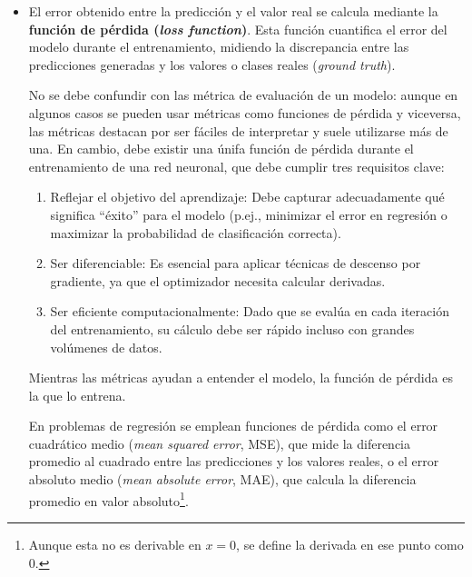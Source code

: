 \begin{itemize}

    \item El error obtenido entre la predicción y el valor real se calcula mediante la \textbf{función de 
    pérdida (\textit{loss function})}. Esta función cuantifica el error del modelo durante el entrenamiento, 
    midiendo la discrepancia entre las predicciones generadas y los valores o clases reales (\textit{ground 
    truth}).

    No se debe confundir con las métrica de evaluación de un modelo: aunque en algunos casos se pueden usar 
    métricas como funciones de pérdida y viceversa, las métricas destacan por ser fáciles de interpretar 
    y suele utilizarse más de una. En cambio, debe existir una únifa función de pérdida durante el 
    entrenamiento de una red neuronal, que debe cumplir tres requisitos clave:

    \begin{enumerate}

        \item Reflejar el objetivo del aprendizaje: Debe capturar adecuadamente qué significa ``éxito'' para 
        el modelo (p.ej., minimizar el error en regresión o maximizar la probabilidad de clasificación 
        correcta).

        \item Ser diferenciable: Es esencial para aplicar técnicas de descenso por gradiente, ya que el 
        optimizador necesita calcular derivadas.

        \item Ser eficiente computacionalmente: Dado que se evalúa en cada iteración del entrenamiento, su 
        cálculo debe ser rápido incluso con grandes volúmenes de datos.

    \end{enumerate}

    Mientras las métricas ayudan a entender el modelo, la función de pérdida es la que lo entrena.

    En problemas de regresión se emplean funciones de pérdida como el error cuadrático medio (\textit{mean 
    squared error}, MSE), que mide la diferencia promedio al cuadrado entre las predicciones y los valores 
    reales, o el error absoluto medio (\textit{mean absolute error}, MAE), que calcula la diferencia promedio 
    en valor absoluto\footnote{
        Aunque esta no es derivable en $x=0$, se define la derivada en ese punto como 0.
    }.


\end{itemize}
